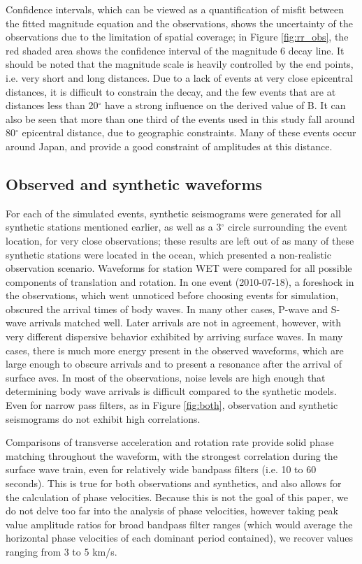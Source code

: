 \documentclass{gji}
\begin{document}
Confidence intervals, which can be viewed as a quantification of misfit between the fitted magnitude equation and the observations, shows the uncertainty of the observations due to the limitation of spatial coverage; in Figure \ref{fig:rr_obs}, the red shaded area shows the confidence interval of the magnitude 6 decay line. %
It should be noted that the magnitude scale is heavily controlled by the end points, i.e. very short and long distances. Due to a lack of events at very close epicentral distances, it is difficult to constrain the decay, and the few events that are at distances less than 20$^\circ$ have a strong influence on the derived value of B. It can also be seen that more than one third of the events used in this study fall around 80$^\circ$ epicentral distance, due to geographic constraints. Many of these events occur around Japan, and provide a good constraint of amplitudes at this distance.


\subsection{Observed and synthetic waveforms}
For each of the simulated events, synthetic seismograms were generated for all synthetic stations mentioned earlier, as well as a 3$^\circ$ circle surrounding the event location, for very close observations; these results are left out of  as many of these synthetic stations were located in the ocean, which presented a non-realistic observation scenario. Waveforms for station WET were compared for all possible components of translation and rotation. In one event (2010-07-18), a foreshock in the observations, which went unnoticed before choosing events for simulation, obscured the arrival times of body waves. In many other cases, P-wave and S-wave arrivals matched well. Later arrivals are not in agreement, however, with very different dispersive behavior exhibited by arriving surface waves. In many cases, there is much more energy present in the observed waveforms, which are large enough to obscure arrivals and to present a resonance after the arrival of surface aves. In most of the observations, noise levels are high enough that determining body wave arrivals is difficult compared to the synthetic models. Even for narrow pass filters, as in Figure \ref{fig:both}, observation and synthetic seismograms do not exhibit high correlations. 

Comparisons of transverse acceleration and rotation rate provide solid phase matching throughout the waveform, with the strongest correlation during the surface wave train, even for relatively wide bandpass filters (i.e. 10 to 60 seconds). This is true for both observations and synthetics, and also allows for the calculation of phase velocities. Because this is not the goal of this paper, we do not delve too far into the analysis of phase velocities, however taking peak value amplitude ratios for broad bandpass filter ranges (which would average the horizontal phase velocities of each dominant period contained), we recover values ranging from 3 to 5 km/s. 
\end{document}
